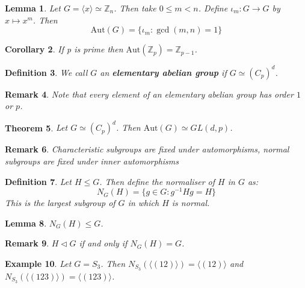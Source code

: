 \documentclass[a4paper,10pt]{article}
\newcommand{\ZZ}{\mathbb{Z}}
\newtheorem{thm}{Theorem}
\newtheorem{Def}[thm]{Definition}
\newtheorem{Cor}[thm]{Corollary}
\newtheorem{eg}[thm]{Example}
\newtheorem{Lem}[thm]{Lemma}
\newtheorem{rem}[thm]{Remark}
\begin{document}
\begin{Lem}
Let $G = \langle x \rangle \simeq \ZZ_n$. Then take $0 \leq m < n$. Define $\iota_m : G \rightarrow G$ by $x \mapsto x^m$. Then
\[ \text{Aut}(G) = \{ \iota_m : \gcd(m,n) = 1 \} \]
\end{Lem}

\begin{Cor}
If p is prime then $\text{Aut}(\ZZ_p) = \ZZ_{p-1}$. 
\end{Cor}

\begin{Def}
We call $G$ an \textbf{elementary abelian group} if $G \simeq (C_p )^d$. 
\end{Def}

\begin{rem}
Note that every element of an elementary abelian group has order $1$ or $p$.
\end{rem}

\begin{thm}
Let $G \simeq (C_p)^d$. Then $\text{Aut}(G) \simeq GL(d,p)$. 
\end{thm}

\begin{rem}
Characteristic subgroups are fixed under automorphisms, normal subgroups are fixed under inner automorphisms
\end{rem}

\begin{Def}
Let $H \leq G$. Then define the normaliser of $H$ in $G$ as:
\[ N_G(H) = \{ g \in G : g^{-1}Hg = H \} \]
This is the largest subgroup of $G$ in which $H$ is normal.
\end{Def}
\begin{Lem}
$N_G(H) \leq G$. 
\end{Lem}
\begin{rem}
$H \triangleleft G$ if and only if $N_G(H) = G$. 
\end{rem}
\begin{eg}
Let $G = S_3$. Then $N_{S_3}( \langle (12) \rangle) = \langle (12) \rangle$ and $N_{S_3}( \langle (123) \rangle ) = \langle (123) \rangle$.
\end{eg}
\end{document}
